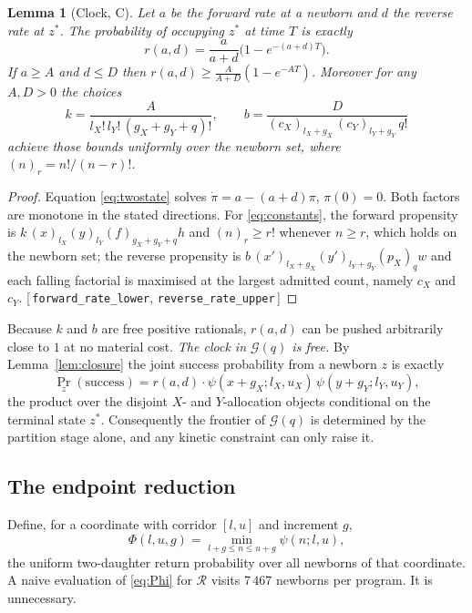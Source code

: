 \documentclass[11pt]{article}
\theoremstyle{plain}
\newtheorem{lemma}[theorem]{Lemma}
\theoremstyle{definition}
\theoremstyle{remark}
\newcommand{\leanref}[1]{{\normalfont\sffamily\footnotesize[\,#1\,]}}
\begin{document}
\begin{lemma}[Clock, C]\label{lem:clock}
Let $a$ be the forward rate at a newborn and $d$ the reverse rate at $z^*$.
The probability of occupying $z^{*}$ at time $T$ is exactly
\begin{equation}\label{eq:twostate}
r(a,d)=\frac{a}{a+d}\bigl(1-e^{-(a+d)T}\bigr).
\end{equation}
If $a\ge A$ and $d\le D$ then $r(a,d)\ge\frac{A}{A+D}(1-e^{-AT})$. Moreover
for any $A,D>0$ the choices
\begin{equation}\label{eq:constants}
k=\frac{A}{l_X!\,l_Y!\,(g_X+g_Y+q)!},\qquad
b=\frac{D}{(c_X)_{l_X+g_X}\,(c_Y)_{l_Y+g_Y}\,q!}
\end{equation}
achieve those bounds uniformly over the newborn set, where
$(n)_r=n!/(n-r)!$.
\end{lemma}

\begin{proof}
Equation \eqref{eq:twostate} solves $\dot\pi=a-(a+d)\pi$, $\pi(0)=0$. Both
factors are monotone in the stated directions. For \eqref{eq:constants}, the
forward propensity is $k\,(x)_{l_X}(y)_{l_Y}(f)_{g_X+g_Y+q}h$ and
$(n)_r\ge r!$ whenever $n\ge r$, which holds on the newborn set; the reverse
propensity is $b\,(x')_{l_X+g_X}(y')_{l_Y+g_Y}(p_X)_{q}w$ and each falling
factorial is maximised at the largest admitted count, namely $c_X$ and $c_Y$.
\leanref{\texttt{forward\_rate\_lower}, \texttt{reverse\_rate\_upper}}
\end{proof}

Because $k$ and $b$ are free positive rationals, $r(a,d)$ can be pushed
arbitrarily close to $1$ at no material cost. \emph{The clock in
$\mathcal{G}(q)$ is free.} By Lemma~\ref{lem:closure} the joint success
probability from a newborn $z$ is exactly
\begin{equation}\label{eq:jointprop}
\Pr_z(\text{success})=r(a,d)\cdot
\psi(x+g_X;l_X,u_X)\,\psi(y+g_Y;l_Y,u_Y),
\end{equation}
the product over the disjoint $X$- and $Y$-allocation objects conditional on
the terminal state $z^{*}$. Consequently the frontier of $\mathcal{G}(q)$ is
determined by the partition stage alone, and any kinetic constraint can only
raise it.

\subsection{The endpoint reduction}

Define, for a coordinate with corridor $[l,u]$ and increment $g$,
\begin{equation}\label{eq:Phi}
\Phi(l,u,g)=\min_{l+g\le n\le u+g}\psi(n;l,u),
\end{equation}
the uniform two-daughter return probability over all newborns of that
coordinate. A naive evaluation of \eqref{eq:Phi} for $\mathcal{R}$ visits $7\,467$ newborns per program. It is unnecessary.
\end{document}
